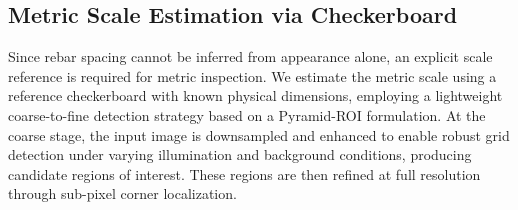 \documentclass{article}
\begin{document}


\vspace{-0.3cm}

\subsection{Metric Scale Estimation via Checkerboard}
\label{sub:checkerboard}

Since rebar spacing cannot be inferred from appearance alone, an explicit scale reference is required for metric inspection. We estimate the metric scale using a reference checkerboard with known physical dimensions, employing a lightweight coarse-to-fine detection strategy based on a Pyramid-ROI formulation. At the coarse stage, the input image is downsampled and enhanced to enable robust grid detection under varying illumination and background conditions, producing candidate regions of interest. These regions are then refined at full resolution through sub-pixel corner localization.
\end{document}
